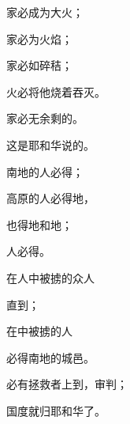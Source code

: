 {\par }{\Q {}家必成为大火；
\par }{家必为火焰；
\par }{家必如碎秸；
\par }{\Q 火必将他烧着吞灭。
\par }{家必无余剩的。
\par }{\Q 这是耶和华说的。
\par }{\BB \par }{\Q {}南地的人必得{}；
\par }{\Q 高原的人必得{}地，
\par }{\Q 也得{}地和{}地；
\par }{人必得{}。
\par }{\Q {}在{}人中被掳的{}众人
\par }{直到{}；
\par }{\Q 在{}中被掳的{}人
\par }{\Q 必得南地的城邑。
\par }{\Q {}必有拯救者上到{}，审判{}；
\par }{\Q 国度就归耶和华了。
\par }